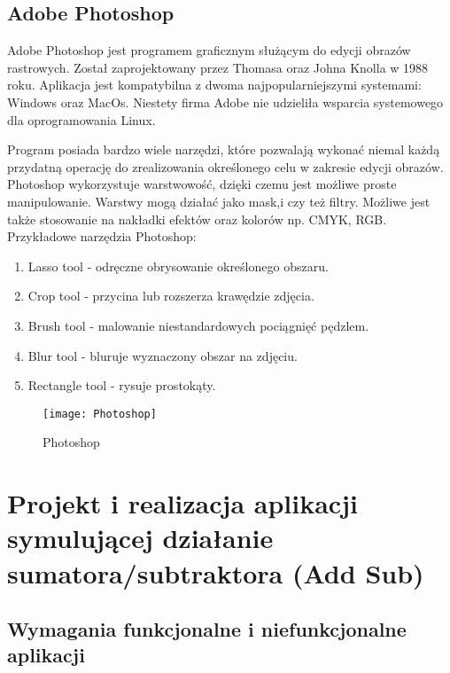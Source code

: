 \documentclass[12pt, a4paper, onside, polish]{article}				%
\begin{document}
\subsection{Adobe Photoshop}
\hspace{\parindent}
Adobe Photoshop jest programem graficznym służącym do edycji obrazów rastrowych. Został zaprojektowany przez Thomasa oraz Johna Knolla w 1988 roku. Aplikacja jest kompatybilna z dwoma najpopularniejszymi systemami: Windows oraz MacOs. Niestety firma Adobe nie udzieliła wsparcia systemowego dla oprogramowania Linux.  

Program posiada bardzo wiele narzędzi, które pozwalają wykonać niemal każdą przydatną operację do zrealizowania określonego celu w zakresie edycji obrazów. Photoshop wykorzystuje warstwowość, dzięki czemu jest możliwe proste manipulowanie. Warstwy mogą działać jako mask,i czy też filtry. Możliwe jest także stosowanie na nakładki efektów oraz kolorów np. CMYK, RGB.  
\newline\newline
Przykładowe narzędzia Photoshop:
 \begin{enumerate}
\item Lasso tool - odręczne obrysowanie określonego obszaru.
\item Crop tool - przycina lub rozszerza krawędzie zdjęcia.
\item Brush tool - malowanie niestandardowych pociągnięć pędzlem.
\item Blur tool - bluruje wyznaczony obszar na zdjęciu.
\item Rectangle tool - rysuje prostokąty. \newline
 \end{enumerate}
   	\begin{figure}[hbt!]
  	  {\centering \texttt{[image: Photoshop]} \caption{Photoshop}}\vspace{5mm}
  	 \end{figure}
  	 
\cleardoublepage







\section{Projekt i realizacja aplikacji symulującej działanie sumatora/subtraktora (Add Sub)}
\subsection{Wymagania funkcjonalne i niefunkcjonalne aplikacji}
\cleardoublepage
\end{document}
